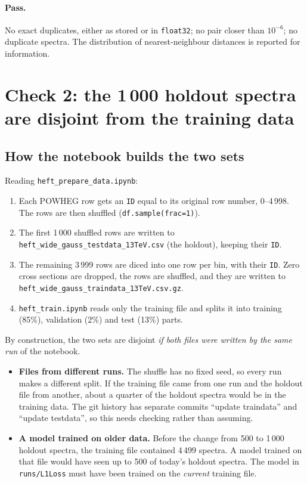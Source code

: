 \documentclass[11pt]{article}
\newcommand{\file}[1]{\nolinkurl{#1}}
\newcommand{\code}[1]{\texttt{#1}}
\begin{document}
\paragraph{Pass.} No exact duplicates, either as stored or in \code{float32}; no
pair closer than $10^{-6}$; no duplicate spectra. The distribution of
nearest-neighbour distances is reported for information.

\section{Check 2: the 1\,000 holdout spectra are disjoint from the training data}

\subsection{How the notebook builds the two sets}

Reading \code{heft\_prepare\_data.ipynb}:
\begin{enumerate}
  \item Each POWHEG row gets an \code{ID} equal to its original row number,
  0--4\,998. The rows are then shuffled (\code{df.sample(frac=1)}).
  \item The first 1\,000 shuffled rows are written to
  \file{heft_wide_gauss_testdata_13TeV.csv} (the holdout), keeping their \code{ID}.
  \item The remaining 3\,999 rows are diced into one row per bin, with their
  \code{ID}. Zero cross sections are dropped, the rows are shuffled, and they are
  written to \file{heft_wide_gauss_traindata_13TeV.csv.gz}.
  \item \code{heft\_train.ipynb} reads only the training file and splits it into
  training (85\%), validation (2\%) and test (13\%) parts.
\end{enumerate}
By construction, the two sets are disjoint \emph{if both files were written by the
same run} of the notebook.

\begin{watch}
\begin{itemize}
  \item \textbf{Files from different runs.} The shuffle has no fixed seed, so every
  run makes a different split. If the training file came from one run and the
  holdout file from another, about a quarter of the holdout spectra would be in the
  training data. The git history has separate commits ``update traindata'' and
  ``update testdata'', so this needs checking rather than assuming.
  \item \textbf{A model trained on older data.} Before the change from 500 to 1\,000
  holdout spectra, the training file contained 4\,499 spectra. A model trained on
  that file would have seen up to 500 of today's holdout spectra. The model in
  \file{runs/L1Loss} must have been trained on the \emph{current} training file.
\end{itemize}
\end{watch}
\end{document}
